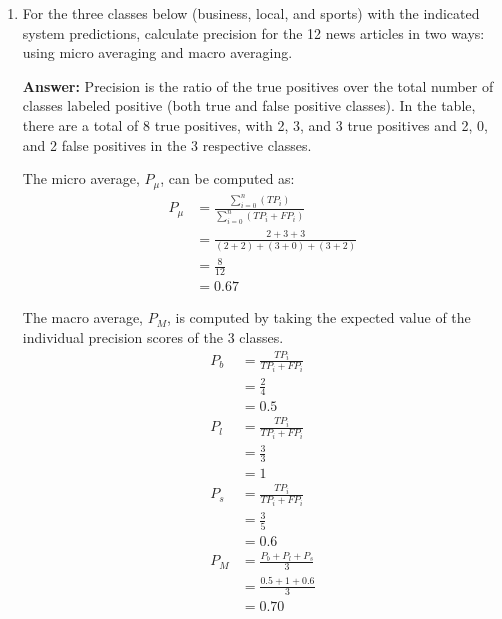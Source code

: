 \documentclass[11pt]{article}
\begin{document}
\begin{enumerate}
\begin{enumerate}
          \item For the three classes below (business, local, and sports) with the indicated system predictions, calculate precision for the 12 news articles in two ways: using micro averaging and macro averaging.

                \textbf{Answer:} Precision is the ratio of the true positives over the total number of classes labeled positive (both true and false positive classes). In the table, there are a total of 8 true positives, with 2, 3, and 3 true positives and 2, 0, and 2 false positives in the 3 respective classes.

                The micro average, $P_{\mu}$, can be computed as:
                \begin{align*}
                  P_{\mu} & = \frac{\sum_{i=0}^{n}(TP_i)}{\sum_{i=0}^{n}(TP_i+FP_i)} \\
                          & = \frac{2+3+3}{(2+2)+(3+0)+(3+2)}                        \\
                          & = \frac{8}{12}                                           \\
                          & = 0.67
                \end{align*}

                The macro average, $P_{M}$, is computed by taking the expected value of the individual precision scores of the 3 classes.
                \begin{align*}
                  P_{b} & = \frac{TP_i}{TP_i+FP_i}      \\
                        & = \frac{2}{4}                 \\
                        & = 0.5                         \\
                  P_{l} & = \frac{TP_i}{TP_i+FP_i}      \\
                        & = \frac{3}{3}                 \\
                        & = 1                           \\
                  P_{s} & = \frac{TP_i}{TP_i+FP_i}      \\
                        & = \frac{3}{5}                 \\
                        & = 0.6                         \\
                  P_{M} & = \frac{P_{b}+P_{l}+P_{s}}{3} \\
                        & = \frac{0.5+1+0.6}{3}         \\
                        & = 0.70
                \end{align*}


\end{enumerate}
\end{enumerate}
\end{document}
